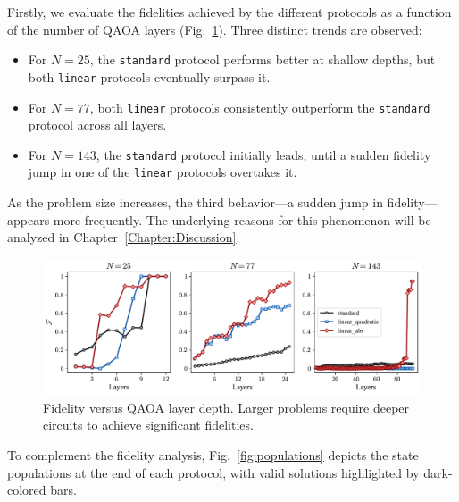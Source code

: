 Firstly, we evaluate the fidelities achieved by the different protocols as a function of the number of QAOA layers (Fig.~\ref{fig:fidelity_layers}). Three distinct trends are observed:  
\begin{itemize}
    \item For $N = 25$, the \texttt{standard} protocol performs better at shallow depths, but both \texttt{linear} protocols eventually surpass it.  
    \item For $N = 77$, both \texttt{linear} protocols consistently outperform the \texttt{standard} protocol across all layers.  
    \item For $N = 143$, the \texttt{standard} protocol initially leads, until a sudden fidelity jump in one of the \texttt{linear} protocols overtakes it.  
\end{itemize}

As the problem size increases, the third behavior---a sudden jump in fidelity---appears more frequently. The underlying reasons for this phenomenon will be analyzed in Chapter~\ref{Chapter:Discussion}.  

\begin{figure}[h]
    \centering
    \includegraphics[width=1\textwidth]{04-results/figs/fidelity_layers_2577143.pdf}
    \caption{Fidelity versus QAOA layer depth. Larger problems require deeper circuits to achieve significant fidelities.}
    \label{fig:fidelity_layers}
\end{figure}

To complement the fidelity analysis, Fig.~\ref{fig:populations} depicts the state populations
at the end of each protocol, with valid solutions highlighted by dark-colored bars.

